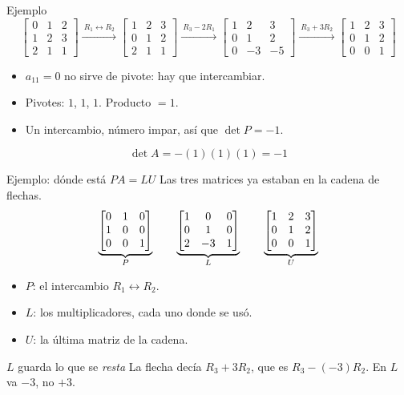 \documentclass[aspectratio=169,11pt]{beamer}
\newcommand{\dt}[1]{\det #1}
\newcommand{\mat}[1]{%
  \begin{bmatrix} #1 \end{bmatrix}%
}
\begin{document}
\begin{frame}{Ejemplo}
  \footnotesize
  \[
    \mat{0 & 1 & 2 \\ 1 & 2 & 3 \\ 2 & 1 & 1}
    \xrightarrow{\ R_1 \leftrightarrow R_2\ }
    \mat{1 & 2 & 3 \\ 0 & 1 & 2 \\ 2 & 1 & 1}
    \xrightarrow{\ R_3 - 2R_1\ }
    \mat{1 & 2 & 3 \\ 0 & 1 & 2 \\ 0 & -3 & -5}
    \xrightarrow{\ R_3 + 3R_2\ }
    \mat{1 & 2 & 3 \\ 0 & 1 & 2 \\ 0 & 0 & 1}
  \]
  \normalsize

  \begin{itemize}
    \item $a_{11} = 0$ no sirve de pivote: hay que intercambiar.
    \item Pivotes: $1$, $1$, $1$. Producto $= 1$.
    \item Un intercambio, número impar, así que $\dt{P} = -1$.
  \end{itemize}

  \[
    \dt{A} = -(1)(1)(1) = -1
  \]
\end{frame}

\begin{frame}{Ejemplo: dónde está $PA = LU$}
  Las tres matrices ya estaban en la cadena de flechas.
  \[
    \underbrace{\mat{0 & 1 & 0 \\ 1 & 0 & 0 \\ 0 & 0 & 1}}_{P}
    \qquad
    \underbrace{\mat{1 & 0 & 0 \\ 0 & 1 & 0 \\ 2 & -3 & 1}}_{L}
    \qquad
    \underbrace{\mat{1 & 2 & 3 \\ 0 & 1 & 2 \\ 0 & 0 & 1}}_{U}
  \]

  \begin{itemize}
    \item $P$: el intercambio $R_1 \leftrightarrow R_2$.
    \item $L$: los multiplicadores, cada uno donde se usó.
    \item $U$: la última matriz de la cadena.
  \end{itemize}

  \begin{alertblock}{$L$ guarda lo que se \emph{resta}}
    La flecha decía $R_3 + 3R_2$, que es $R_3 - (-3)R_2$. En $L$ va
    $-3$, no $+3$.
  \end{alertblock}
\end{frame}
\end{document}
